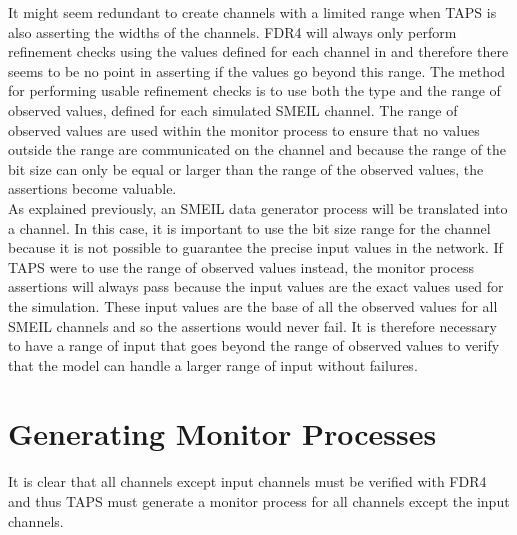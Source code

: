 It might seem redundant to create \cspm{} channels with a limited range when TAPS is also asserting the widths of the channels. FDR4 will always only perform refinement checks using the values defined for each channel in \cspm{} and therefore there seems to be no point in asserting if the values go beyond this range. The method for performing usable refinement checks is to use both the type and the range of observed values, defined for each simulated SMEIL channel. The range of observed values are used within the monitor process to ensure that no values outside the range are communicated on the channel and because the range of the bit size can only be equal or larger than the range of the observed values, the assertions become valuable. \\

As explained previously, an SMEIL data generator process will be translated into a \cspm{} channel. In this case, it is important to use the bit size range for the \cspm{} channel because it is not possible to guarantee the precise input values in the network. If TAPS were to use the range of observed values instead, the monitor process assertions will always pass because the input values are the exact values used for the simulation. These input values are the base of all the observed values for all SMEIL channels and so the assertions would never fail. It is therefore necessary to have a range of input that goes beyond the range of observed values to verify that the model can handle a larger range of input without failures.
\section{Generating Monitor Processes}

It is clear that all channels except input channels must be verified with FDR4 and thus TAPS must generate a monitor process for all channels except the input channels.


